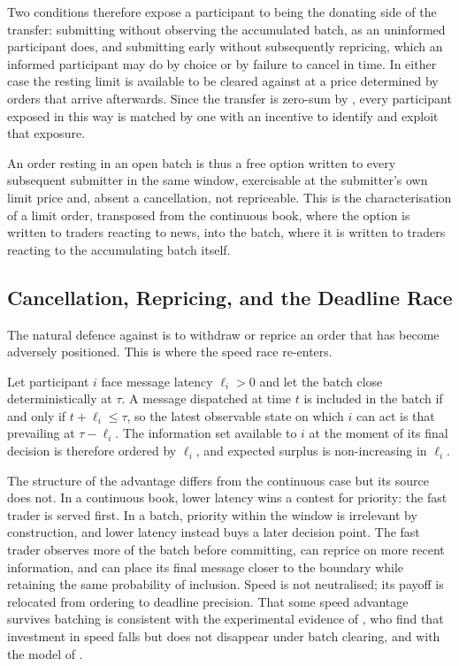 Two conditions therefore expose a participant to being the donating side
of the transfer: submitting without observing the accumulated batch, as
an uninformed participant does, and submitting early without
subsequently repricing, which an informed participant may do by choice
or by failure to cancel in time. In either case the resting limit is
available to be cleared against at a price determined by orders that
arrive afterwards. Since the transfer is zero-sum by
, every participant exposed in this way is matched
by one with an incentive to identify and exploit that exposure.



An order resting in an open batch is thus a free option written to every
subsequent submitter in the same window, exercisable at the submitter's
own limit price and, absent a cancellation, not repriceable. This is the
\citet{copeland1983information} characterisation of a limit order,
transposed from the continuous book, where the option is written to
traders reacting to news, into the batch, where it is written to traders
reacting to the accumulating batch itself.

\subsection{Cancellation, Repricing, and the Deadline Race}

The natural defence against  is to withdraw or
reprice an order that has become adversely positioned. This is where the
speed race re-enters.

\begin{proposition}
\label{prop:latency}
Let participant $i$ face message latency $\ell_i > 0$ and let the batch
close deterministically at $\tau$. A message dispatched at time $t$ is
included in the batch if and only if $t + \ell_i \le \tau$, so the
latest observable state on which $i$ can act is that prevailing at
$\tau - \ell_i$. The information set available to $i$ at the moment of
its final decision is therefore ordered by $\ell_i$, and expected
surplus is non-increasing in $\ell_i$.
\end{proposition}

The structure of the advantage differs from the continuous case but its
source does not. In a continuous book, lower latency wins a contest for
priority: the fast trader is served first. In a batch, priority within
the window is irrelevant by construction, and lower latency instead buys
a later decision point. The fast trader observes more of the batch
before committing, can reprice on more recent information, and can place
its final message closer to the boundary while retaining the same
probability of inclusion. Speed is not neutralised; its payoff is
relocated from ordering to deadline precision. That some speed advantage
survives batching is consistent with the experimental evidence of
\citet{aldrich2020experiments}, who find that investment in speed falls
but does not disappear under batch clearing, and with the model of
\citet{zoican2021speed}.

